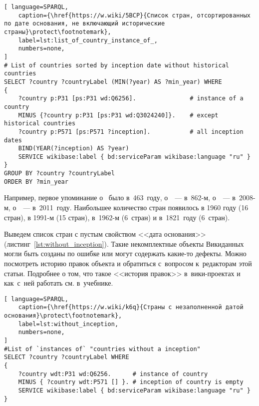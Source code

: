 \begin{lstlisting}[ language=SPARQL, 
    caption={\href{https://w.wiki/5BCP}{Список стран, отсортированных по дате основания, не включающий исторические страны}\protect\footnotemark},
    label=lst:list_of_country_instance_of_, 
    numbers=none,
]
# List of countries sorted by inception date without historical countries
SELECT ?country ?countryLabel (MIN(?year) AS ?min_year) WHERE
{
	?country p:P31 [ps:P31 wd:Q6256].               # instance of a country 
	MINUS {?country p:P31 [ps:P31 wd:Q3024240]}.    # except historical countries
	?country p:P571 [ps:P571 ?inception].           # all inception dates
	BIND(YEAR(?inception) AS ?year)
	SERVICE wikibase:label { bd:serviceParam wikibase:language "ru" }
}
GROUP BY ?country ?countryLabel
ORDER BY ?min_year
\end{lstlisting}


Например, первое упоминание о~ было в~463~году, 
о~~--- в~862-м, 
о~~--- в~2008-м, 
о~~--- в~2011~году. 
Наибольшее количество стран появилось в 1960 году (16 стран), 
в 1991-м (15 стран), в~1962-м (6~стран) и в~1821~году (6~стран).


\newpage
Выведем список стран с пустым свойством <<дата основания>> (листинг~\ref{lst:without_inception}). 
Такие некомплектные объекты Викиданных могли быть созданы по ошибке или могут содержать какие-то дефекты. 
Можно посмотреть историю правок объекта и обратиться с~вопросом к~редакторам этой статьи. 
Подробнее о том, что такое <<история правок>> в~вики-проектах 
и как~с~ней работать см. в~учебнике.

\begin{lstlisting}[ language=SPARQL, 
    caption={\href{https://w.wiki/k6q}{Страны с незаполненной датой основания}\protect\footnotemark},
    label=lst:without_inception,
    numbers=none,
]
#List of `instances of` "countries without a inception" 
SELECT ?country ?countryLabel WHERE
{
    ?country wdt:P31 wd:Q6256.      # instance of country
    MINUS { ?country wdt:P571 [] }. # inception of country is empty
    SERVICE wikibase:label { bd:serviceParam wikibase:language "ru" }
}
\end{lstlisting}




